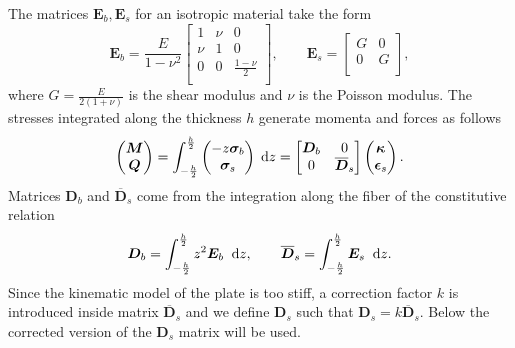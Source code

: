 \documentclass[preprint,12pt]{elsarticle}
\begin{document}
The matrices $\bm{E}_b, \bm{E}_s$ for an isotropic material take the form\begin{equation}
\bm{E}_b =
\frac{E}{1 - \nu^2}
\begin{bmatrix}
1 & \nu & 0 \\
\nu & 1 & 0 \\
0  &  0 & \frac{1-\nu}{2}\\
\end{bmatrix},
\qquad
\bm{E}_s = 
\begin{bmatrix}
G & 0 \\
0 & G \\
\end{bmatrix},
\end{equation}
where $G=\frac{E}{2(1 + \nu)}$ is the shear modulus and $\nu$ is the Poisson modulus.
The stresses integrated along the thickness $h$ generate momenta and forces as follows
\begin{equation}
\begin{pmatrix}
\bm{M} \\
\bm{Q} \\
\end{pmatrix} = \int_{-\frac{h}{2} }^{\frac{h}{2}}
\begin{pmatrix}
-z \bm{\sigma}_b \\
\bm{\sigma}_s \\
\end{pmatrix} \d{z}=
\begin{bmatrix}
\bm{D}_b & 0 \\
0 & \overline{\bm{D}}_s \\
\end{bmatrix}
\begin{pmatrix}
\bm{\kappa} \\
\bm{\epsilon}_s \\
\end{pmatrix}.
\end{equation}
Matrices $\bm{D}_b$ and $\overline{\bm{D}}_s$ come from the integration along the fiber of the constitutive relation
\begin{equation}
\bm{D}_b = \int_{-\frac{h}{2} }^{\frac{h}{2}} z^2 \bm{E}_b \; \d{z}, \qquad
\overline{\bm{D}}_s = \int_{-\frac{h}{2} }^{\frac{h}{2}} \bm{E}_s \; \d{z}.
\end{equation}
Since the kinematic model of the plate is too stiff, a correction factor $k$ is introduced inside matrix $\overline{\bm{D}}_s$ and we define $\bm{D}_s$ such that $\bm{D}_s = k \overline{\bm{D}}_s$. Below the corrected version of the $\bm{D}_s$ matrix will be used.
\end{document}
